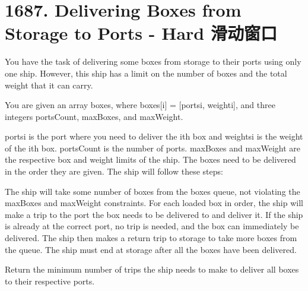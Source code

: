 \documentclass[9pt, b5paaper]{book}
\begin{document}
\section{1687. Delivering Boxes from Storage to Ports - Hard 滑动窗口}
\label{sec-12-7}
You have the task of delivering some boxes from storage to their ports using only one ship. However, this ship has a limit on the number of boxes and the total weight that it can carry.

You are given an array boxes, where boxes[i] = [ports​​i​, weighti], and three integers portsCount, maxBoxes, and maxWeight.

ports​​i is the port where you need to deliver the ith box and weightsi is the weight of the ith box.
portsCount is the number of ports.
maxBoxes and maxWeight are the respective box and weight limits of the ship.
The boxes need to be delivered in the order they are given. The ship will follow these steps:

The ship will take some number of boxes from the boxes queue, not violating the maxBoxes and maxWeight constraints.
For each loaded box in order, the ship will make a trip to the port the box needs to be delivered to and deliver it. If the ship is already at the correct port, no trip is needed, and the box can immediately be delivered.
The ship then makes a return trip to storage to take more boxes from the queue.
The ship must end at storage after all the boxes have been delivered.

Return the minimum number of trips the ship needs to make to deliver all boxes to their respective ports.
\end{document}

